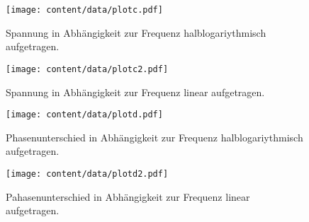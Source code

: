 \begin{figure}
    \centering
    \texttt{[image: content/data/plotc.pdf]}
    \caption{Spannung in Abhängigkeit zur Frequenz halblogariythmisch aufgetragen.}
    \label{fig:spannung_log}
\end{figure}

\begin{figure}
    \centering
    \texttt{[image: content/data/plotc2.pdf]}
    \caption{Spannung in Abhängigkeit zur Frequenz linear aufgetragen.}
    \label{fig:spannung_lin}
\end{figure}

\begin{figure}
    \centering
    \texttt{[image: content/data/plotd.pdf]}
    \caption{Phasenunterschied in Abhängigkeit zur Frequenz halblogariythmisch aufgetragen.}
    \label{fig:phase_log}
\end{figure}
\begin{figure}
        \centering
        \texttt{[image: content/data/plotd2.pdf]}
        \caption{Pahasenunterschied in Abhängigkeit zur Frequenz linear aufgetragen.} 
        \label{fig:phase_lin}
\end{figure}

